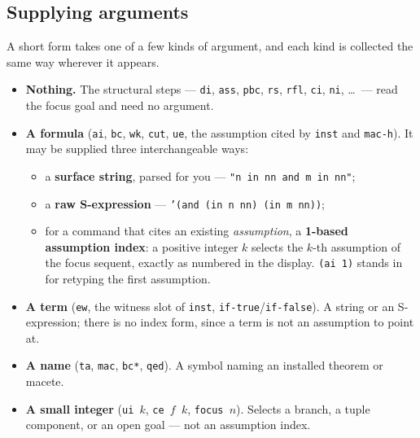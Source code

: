\subsection{Supplying arguments}
\label{sec:arg-collection}

A short form takes one of a few kinds of argument, and each kind is
collected the same way wherever it appears.

\begin{itemize}
\item \textbf{Nothing.}  The structural steps --- \texttt{di}, \texttt{ass},
  \texttt{pbc}, \texttt{rs}, \texttt{rfl}, \texttt{ci}, \texttt{ni},
  \ldots\ --- read the focus goal and need no argument.

\item \textbf{A formula} (\texttt{ai}, \texttt{bc}, \texttt{wk},
  \texttt{cut}, \texttt{ue}, the assumption cited by \texttt{inst} and
  \texttt{mac-h}).  It may be supplied three interchangeable ways:
  \begin{itemize}
  \item a \textbf{surface string}, parsed for you ---
    \texttt{"n in nn and m in nn"};
  \item a \textbf{raw S-expression} ---
    \texttt{'(and (in n nn) (in m nn))};
  \item for a command that cites an existing \emph{assumption}, a
    \textbf{1-based assumption index}: a positive integer $k$ selects the
    $k$-th assumption of the focus sequent, exactly as numbered in the
    display.  \texttt{(ai 1)} stands in for retyping the first assumption.
  \end{itemize}

\item \textbf{A term} (\texttt{ew}, the witness slot of \texttt{inst},
  \texttt{if-true}/\texttt{if-false}).  A string or an S-expression; there
  is no index form, since a term is not an assumption to point at.

\item \textbf{A name} (\texttt{ta}, \texttt{mac}, \texttt{bc*},
  \texttt{qed}).  A symbol naming an installed theorem or macete.

\item \textbf{A small integer} (\texttt{ui $k$}, \texttt{ce $f$ $k$},
  \texttt{focus $n$}).  Selects a branch, a tuple component, or an open
  goal --- not an assumption index.
\end{itemize}


